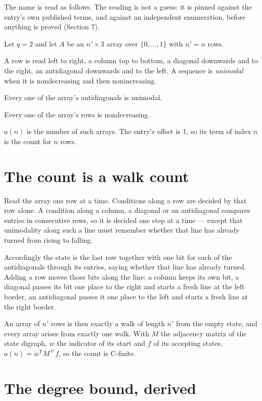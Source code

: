 \documentclass[11pt]{article}
\theoremstyle{definition}
\begin{document}
The name is read as follows. The reading is not a guess: it is pinned against the entry's own published terms, and against an independent enumeration, before anything is proved (Section 7).

Let $q = 2$ and let $A$ be an $n' \times 3$ array over $\{0,\dots,1\}$ with $n' = n$ rows.

A row is read left to right, a column top to bottom, a diagonal downwards and to the right, an antidiagonal downwards and to the left. A sequence is {\itshape unimodal} when it is nondecreasing and then nonincreasing.

Every one of the array's antidiagonals is unimodal.

Every one of the array's rows is nondecreasing.

$a(n)$ is the number of such arrays. The entry's offset is 1, so its term of index $n$ is the count for $n$ rows.

\section{The count is a walk count}

Read the array one row at a time. Conditions along a row are decided by that row alone. A condition along a column, a diagonal or an antidiagonal compares entries in consecutive rows, so it is decided one step at a time --- except that unimodality along such a line must remember whether that line has already turned from rising to falling.

Accordingly the state is the last row together with one bit for each of the antidiagonals through its entries, saying whether that line has already turned. Adding a row moves those bits along the line: a column keeps its own bit, a diagonal passes its bit one place to the right and starts a fresh line at the left border, an antidiagonal passes it one place to the left and starts a fresh line at the right border.

An array of $n'$ rows is then exactly a walk of length $n'$ from the empty state, and every array arises from exactly one walk. With $M$ the adjacency matrix of the state digraph, $w$ the indicator of its start and $f$ of its accepting states, $a(n) = w^{\mathsf T}M^{\,n'}f$, so the count is C-finite.

\section{The degree bound, derived}
\end{document}

